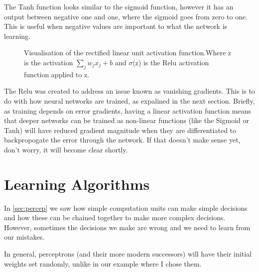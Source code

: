 The Tanh function looks similar to the sigmoid function, however it has an output between negative one and one, where the sigmoid goes from zero to one. This is useful when negative values are important to what the network is learning.

\begin{figure}
\begin{center}
\caption{Visualisation of the rectified linear unit activation function.Where z is the activation $\sum_{j} w_j x_j + b$ and $\sigma$(z) is the Relu activation function applied to z.}
\label{fig:activation_relu}
\end{center}
\end{figure}

The Relu was created to address an issue known as vanishing gradients. This is to do with how neural networks are trained, as expalined in the next section. Briefly, as training depends on error gradients, having a linear activation function means that deeper networks  can be trained as non-linear functions (like the Sigmoid or Tanh) will have reduced gradient magnitude when they are differentiated to backpropogate the error through the network. If that doesn't make sense yet, don't worry, it will become clear shortly.

\section{Learning Algorithms}
In \autoref{sec:percep} we saw how simple computation units can make simple decisions and how these can be chained together to make more complex decisions. However, sometimes the decisions we make are wrong and we need to learn from our mistakes.

In general, perceptrons (and their more modern successors) will have their initial weights set randomly, unlike in our example where I chose them. 

